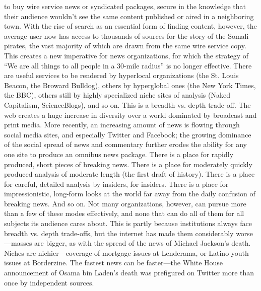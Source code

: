 to buy wire service news or syndicated packages, secure in the knowledge that
their audience wouldn’t see the same content published or aired in a neighboring
town. With the rise of search as an essential form of finding content, however, the
average user now has access to thousands of sources for the story of the Somali
pirates, the vast majority of which are drawn from the same wire service copy.
This creates a new imperative for news organizations, for which the strategy of
``We are all things to all people in a 30-mile radius'' is no longer effective. There
are useful services to be rendered by hyperlocal organizations (the St. Louis Beacon,
the Broward Bulldog), others by hyperglobal ones (the New York Times, the
BBC), others still by highly specialized niche sites of analysis (Naked Capitalism,
ScienceBlogs), and so on.
This is a breadth vs. depth trade-off. The web creates a huge increase in diversity
over a world dominated by broadcast and print media. More recently, an increasing
amount of news is flowing through social media sites, and especially Twitter
and Facebook; the growing dominance of the social spread of news and commentary
further erodes the ability for any one site to produce an omnibus news
package.
There is a place for rapidly produced, short pieces of breaking news. There is a
place for moderately quickly produced analysis of moderate length (the first draft
of history). There is a place for careful, detailed analysis by insiders, for insiders.
There is a place for impressionistic, long-form looks at the world far away from
the daily confusion of breaking news. And so on. Not many organizations, however,
can pursue more than a few of these modes effectively, and none that can
do all of them for all subjects its audience cares about.
This is partly because institutions always face breadth vs. depth trade-offs, but
the internet has made them considerably worse—masses are bigger, as with the
spread of the news of Michael Jackson’s death. Niches are nichier—coverage of
mortgage issues at Lenderama, or Latino youth issues at Borderzine. The fastest
news can be faster—the White House announcement of Osama bin Laden’s
death was prefigured on Twitter more than once by independent sources.

